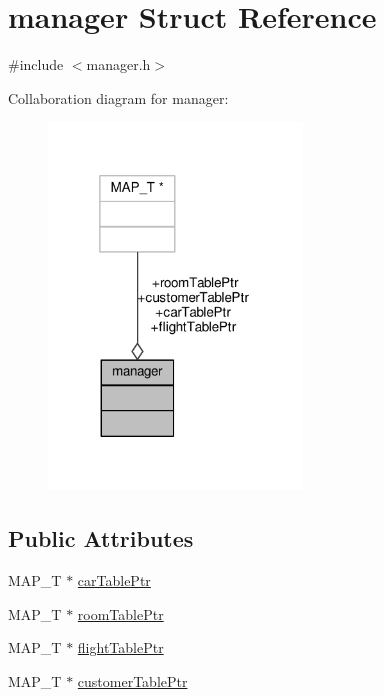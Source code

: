 \hypertarget{structmanager}{\section{manager Struct Reference}
\label{structmanager}
}


{\ttfamily \#include $<$manager.\-h$>$}



Collaboration diagram for manager\-:
\nopagebreak
\begin{figure}[H]
\begin{center}
\leavevmode
\includegraphics[width=191pt]{structmanager__coll__graph}
\end{center}
\end{figure}
\subsection*{Public Attributes}
\begin{DoxyCompactItemize}
\item 
M\-A\-P\-\_\-\-T $\ast$ \hyperlink{structmanager_a3ec323d4689d9385372abdd1dac681b3}{car\-Table\-Ptr}
\item 
M\-A\-P\-\_\-\-T $\ast$ \hyperlink{structmanager_a93b909953ff6e31fbf6d9c24f5ccf813}{room\-Table\-Ptr}
\item 
M\-A\-P\-\_\-\-T $\ast$ \hyperlink{structmanager_a695f3696eaf27977186631aa1e86d4ac}{flight\-Table\-Ptr}
\item 
M\-A\-P\-\_\-\-T $\ast$ \hyperlink{structmanager_aea159e3e4e1a4b7148705067f4f92130}{customer\-Table\-Ptr}
\end{DoxyCompactItemize}


